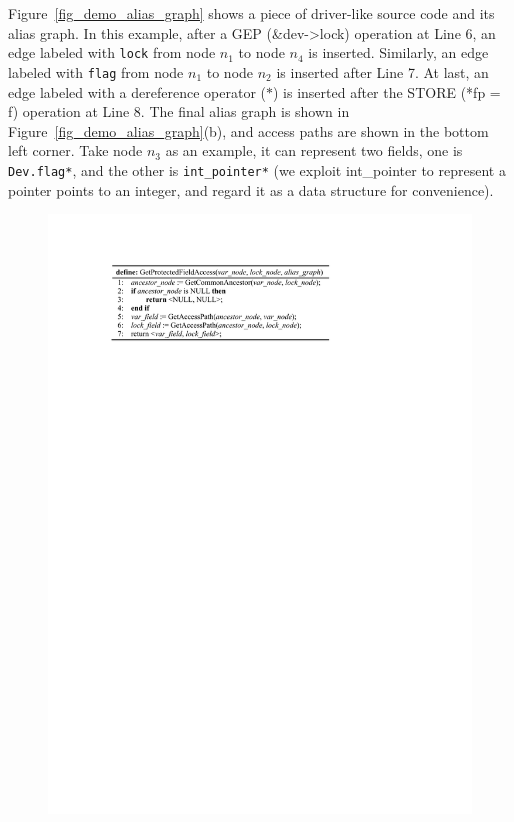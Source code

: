  Figure~\ref{fig_demo_alias_graph} shows a 
piece of driver-like source code and its alias graph. In this example, after a 
GEP (\&dev->lock) operation at Line 6, an edge labeled with {\tt lock} from 
node $\mathit{n_1}$ to node $\mathit{n_4}$ is inserted. Similarly, an edge 
labeled with {\tt flag} from node $\mathit{n_1}$ to node $\mathit{n_2}$ is 
inserted after Line 7. At last, an edge labeled with a dereference operator 
($\mathit{*}$) is inserted after the STORE (*fp = f) operation at Line 8. The 
final alias graph is shown in Figure~\ref{fig_demo_alias_graph}(b), and access 
paths are shown in the bottom left corner. Take node $\mathit{n_3}$ as an 
example, it can represent two fields, one is {\tt Dev.flag*}, and the other is 
{\tt int\_pointer*} (we exploit int\_pointer to represent a pointer points to 
an integer, and regard it as a data structure for convenience). 

\begin{figure}[htbp]
	\centering
	\includegraphics[width=1\linewidth]{figures/fig_pseudocode_get_access.pdf}
	\label{fig_pseudocode_get_access}
\end{figure}

